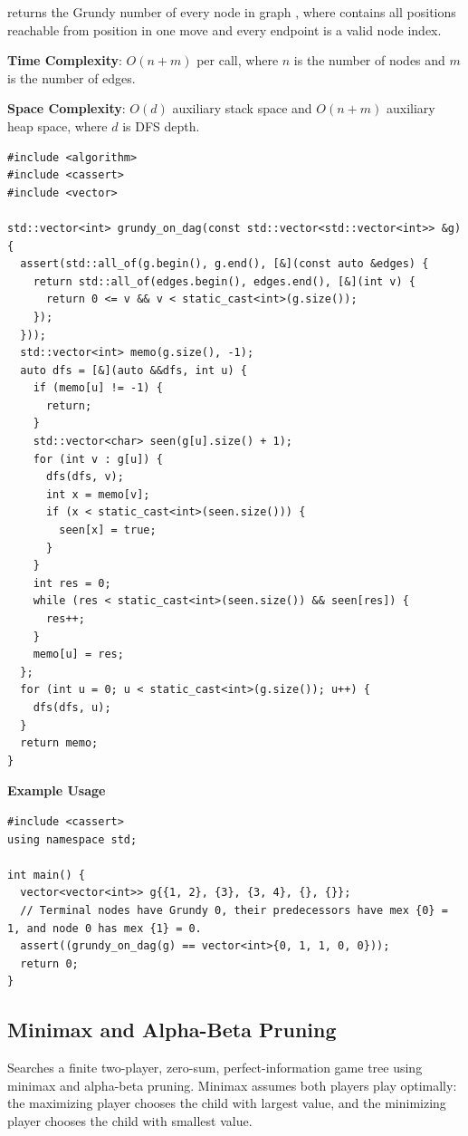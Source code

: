 \begin{compactitem}
  \item {} returns the Grundy number of every node in graph , where  contains all positions reachable from position  in one move and every endpoint is a valid node index.
\end{compactitem}

\textbf{Time Complexity}: $O(n + m)$ per call, where $n$ is the number of nodes and $m$ is the number of edges.

\textbf{Space Complexity}: $O(d)$ auxiliary stack space and $O(n + m)$ auxiliary heap space, where $d$ is DFS depth.

\begin{lstlisting}[style=cpp]
#include <algorithm>
#include <cassert>
#include <vector>

std::vector<int> grundy_on_dag(const std::vector<std::vector<int>> &g) {
  assert(std::all_of(g.begin(), g.end(), [&](const auto &edges) {
    return std::all_of(edges.begin(), edges.end(), [&](int v) {
      return 0 <= v && v < static_cast<int>(g.size());
    });
  }));
  std::vector<int> memo(g.size(), -1);
  auto dfs = [&](auto &&dfs, int u) {
    if (memo[u] != -1) {
      return;
    }
    std::vector<char> seen(g[u].size() + 1);
    for (int v : g[u]) {
      dfs(dfs, v);
      int x = memo[v];
      if (x < static_cast<int>(seen.size())) {
        seen[x] = true;
      }
    }
    int res = 0;
    while (res < static_cast<int>(seen.size()) && seen[res]) {
      res++;
    }
    memo[u] = res;
  };
  for (int u = 0; u < static_cast<int>(g.size()); u++) {
    dfs(dfs, u);
  }
  return memo;
}
\end{lstlisting}
\textbf{Example Usage}\par
\begin{lstlisting}[style=cpp]
#include <cassert>
using namespace std;

int main() {
  vector<vector<int>> g{{1, 2}, {3}, {3, 4}, {}, {}};
  // Terminal nodes have Grundy 0, their predecessors have mex {0} = 1, and node 0 has mex {1} = 0.
  assert((grundy_on_dag(g) == vector<int>{0, 1, 1, 0, 0}));
  return 0;
}
\end{lstlisting}
\subsection{Minimax and Alpha-Beta Pruning}
\label{sec:6.8.5}
Searches a finite two-player, zero-sum, perfect-information game tree using minimax and alpha-beta pruning. Minimax assumes both players play optimally: the maximizing player chooses the child with largest value, and the minimizing player chooses the child with smallest value.

